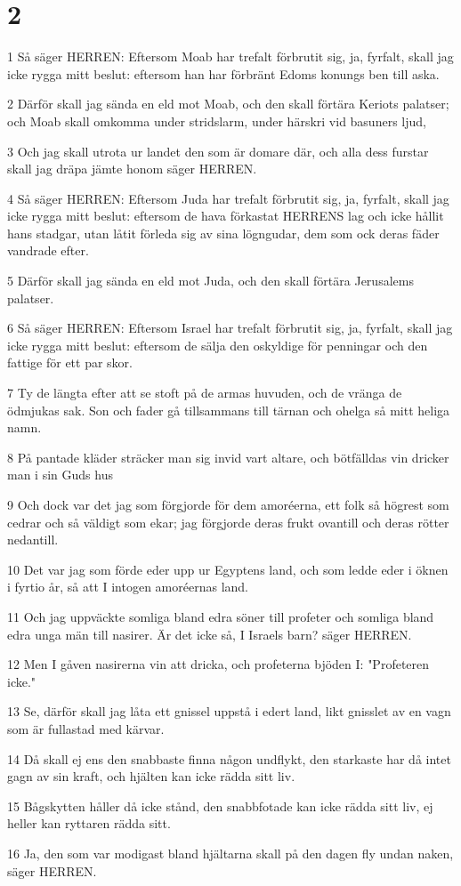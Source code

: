 \chapter{2}

\par 1 Så säger HERREN: Eftersom Moab har trefalt förbrutit sig, ja, fyrfalt, skall jag icke rygga mitt beslut: eftersom han har förbränt Edoms konungs ben till aska.
\par 2 Därför skall jag sända en eld mot Moab, och den skall förtära Keriots palatser; och Moab skall omkomma under stridslarm, under härskri vid basuners ljud,
\par 3 Och jag skall utrota ur landet den som är domare där, och alla dess furstar skall jag dräpa jämte honom säger HERREN.
\par 4 Så säger HERREN: Eftersom Juda har trefalt förbrutit sig, ja, fyrfalt, skall jag icke rygga mitt beslut: eftersom de hava förkastat HERRENS lag och icke hållit hans stadgar, utan låtit förleda sig av sina lögngudar, dem som ock deras fäder vandrade efter.
\par 5 Därför skall jag sända en eld mot Juda, och den skall förtära Jerusalems palatser.
\par 6 Så säger HERREN: Eftersom Israel har trefalt förbrutit sig, ja, fyrfalt, skall jag icke rygga mitt beslut: eftersom de sälja den oskyldige för penningar och den fattige för ett par skor.
\par 7 Ty de längta efter att se stoft på de armas huvuden, och de vränga de ödmjukas sak. Son och fader gå tillsammans till tärnan och ohelga så mitt heliga namn.
\par 8 På pantade kläder sträcker man sig invid vart altare, och bötfälldas vin dricker man i sin Guds hus
\par 9 Och dock var det jag som förgjorde för dem amoréerna, ett folk så högrest som cedrar och så väldigt som ekar; jag förgjorde deras frukt ovantill och deras rötter nedantill.
\par 10 Det var jag som förde eder upp ur Egyptens land, och som ledde eder i öknen i fyrtio år, så att I intogen amoréernas land.
\par 11 Och jag uppväckte somliga bland edra söner till profeter och somliga bland edra unga män till nasirer. Är det icke så, I Israels barn? säger HERREN.
\par 12 Men I gåven nasirerna vin att dricka, och profeterna bjöden I: "Profeteren icke."
\par 13 Se, därför skall jag låta ett gnissel uppstå i edert land, likt gnisslet av en vagn som är fullastad med kärvar.
\par 14 Då skall ej ens den snabbaste finna någon undflykt, den starkaste har då intet gagn av sin kraft, och hjälten kan icke rädda sitt liv.
\par 15 Bågskytten håller då icke stånd, den snabbfotade kan icke rädda sitt liv, ej heller kan ryttaren rädda sitt.
\par 16 Ja, den som var modigast bland hjältarna skall på den dagen fly undan naken, säger HERREN.

